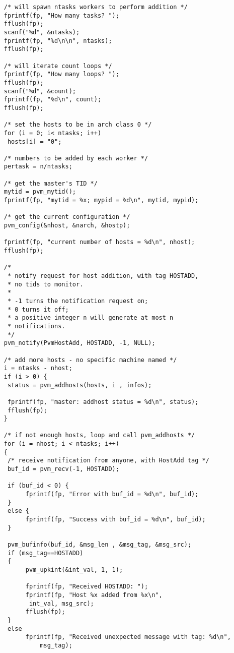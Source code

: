 \begin{small}
\begin{verbatim}
     /* will spawn ntasks workers to perform addition */
     fprintf(fp, "How many tasks? ");
     fflush(fp);
     scanf("%d", &ntasks);
     fprintf(fp, "%d\n\n", ntasks);
     fflush(fp);

     /* will iterate count loops */
     fprintf(fp, "How many loops? ");
     fflush(fp);
     scanf("%d", &count);
     fprintf(fp, "%d\n", count);
     fflush(fp);

     /* set the hosts to be in arch class 0 */
     for (i = 0; i< ntasks; i++) 
	  hosts[i] = "0";

     /* numbers to be added by each worker */
     pertask = n/ntasks;

     /* get the master's TID */
     mytid = pvm_mytid();
     fprintf(fp, "mytid = %x; mypid = %d\n", mytid, mypid);

     /* get the current configuration */
     pvm_config(&nhost, &narch, &hostp);

     fprintf(fp, "current number of hosts = %d\n", nhost);
     fflush(fp);

     /* 
      * notify request for host addition, with tag HOSTADD, 
      * no tids to monitor.  
      *
      * -1 turns the notification request on;
      * 0 turns it off;
      * a positive integer n will generate at most n 
      * notifications.
      */     
     pvm_notify(PvmHostAdd, HOSTADD, -1, NULL);

     /* add more hosts - no specific machine named */
     i = ntasks - nhost;
     if (i > 0) {
	  status = pvm_addhosts(hosts, i , infos);
	  
	  fprintf(fp, "master: addhost status = %d\n", status);
	  fflush(fp);
     }
     
     /* if not enough hosts, loop and call pvm_addhosts */
     for (i = nhost; i < ntasks; i++)
     {
	  /* receive notification from anyone, with HostAdd tag */
	  buf_id = pvm_recv(-1, HOSTADD);

	  if (buf_id < 0) {
	       fprintf(fp, "Error with buf_id = %d\n", buf_id);
	  }
	  else {
	       fprintf(fp, "Success with buf_id = %d\n", buf_id);
	  }

	  pvm_bufinfo(buf_id, &msg_len , &msg_tag, &msg_src);
	  if (msg_tag==HOSTADD)
	  {
	       pvm_upkint(&int_val, 1, 1);

	       fprintf(fp, "Received HOSTADD: ");
	       fprintf(fp, "Host %x added from %x\n", 
			int_val, msg_src);
	       fflush(fp);
	  }
	  else
	       fprintf(fp, "Received unexpected message with tag: %d\n", 
		       msg_tag);


\end{verbatim}
\end{small}
